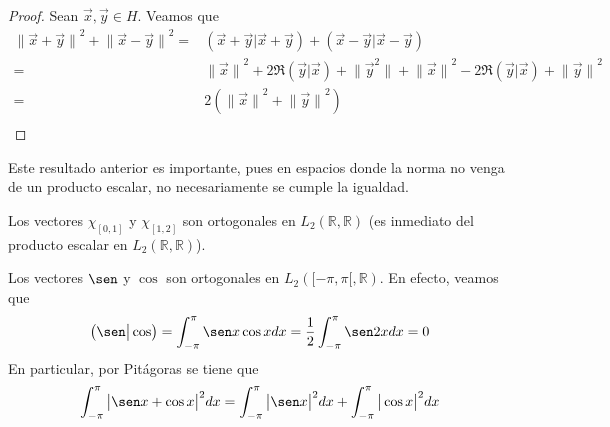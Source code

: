 \documentclass[12pt]{report}
\newcounter{it}
\theoremstyle{largebreak}
\newcommand\abs[1]{\ensuremath{\big|#1\big|}}
\newcommand\norm[1]{\ensuremath{\|#1\|}}
\newcommand\pint[2]{\ensuremath{\left(#1\big| #2\right)}}
\begin{document}
    \begin{proof}
        Sean $\vec{x},\vec{y}\in H$. Veamos que
        \begin{equation*}
            \begin{split}
                \norm{\vec{x}+\vec{y}}^2+\norm{\vec{x}-\vec{y}}^2
                =&\pint{\vec{x}+\vec{y}}{\vec{x}+\vec{y}}+\pint{\vec{x}-\vec{y}}{\vec{x}-\vec{y}}\\
                =&\norm{\vec{x}}^2+2\Re\pint{\vec{y}}{\vec{x}}+\norm{\vec{y}^2}+\norm{\vec{x}}^2-2\Re\pint{\vec{y}}{\vec{x}}+\norm{\vec{y}}^2\\
                =&2(\norm{\vec{x}}^2+\norm{\vec{y}}^2)\\
            \end{split}
        \end{equation*}
    \end{proof}

    Este resultado anterior es importante, pues en espacios donde la norma no venga de un producto escalar, no necesariamente se cumple la igualdad.

    \begin{exa}
        Los vectores $\chi_{[0,1]}$ y $\chi_{[1,2]}$ son ortogonales en $L_2(\mathbb{R},\mathbb{R})$ (es inmediato del producto escalar en $L_2(\mathbb{R},\mathbb{R})$).
    \end{exa}

    \begin{exa}
        Los vectores $\sen$ y $\cos$ son ortogonales en $L_2([-\pi,\pi[,\mathbb{R})$. En efecto, veamos que
        \begin{equation*}
            \pint{\sen}{\cos}=\int_{-\pi}^{\pi}\sen x\cos xdx=\frac{1}{2}\int_{-\pi}^{\pi}\sen 2xdx=0
        \end{equation*}
        En particular, por Pitágoras se tiene que
        \begin{equation*}
            \int_{-\pi}^{\pi}\abs{\sen x+\cos x}^2dx=\int_{-\pi}^{\pi}\abs{\sen x}^2dx+\int_{-\pi}^{\pi}\abs{\cos x}^2dx
        \end{equation*}
    \end{exa}
\end{document}
